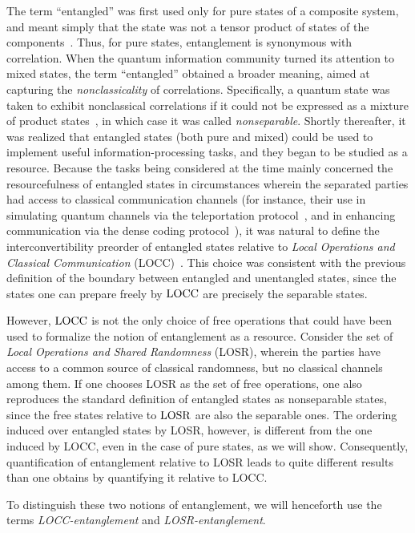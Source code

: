 \documentclass[12pt]{article}
\newcommand{\LOSR}[0]{\ifmmode\textup{\upshape LOSR}\else{\textup{\upshape LOSR}}\fi}
\newcommand{\LOCC}[0]{\ifmmode\textup{\upshape LOCC}\else{\textup{\upshape LOCC}}\fi}
\theoremstyle{plain}
\theoremstyle{definition}
\begin{document}
The term ``entangled'' was first used only for pure states of a composite system, and meant simply that the state was not a tensor product of states of the components~\cite{Schrodinger1935}.  Thus, for pure states, entanglement is synonymous with correlation.  When the quantum information community turned its attention to mixed states, the term ``entangled'' obtained a broader meaning, aimed at capturing the {\em nonclassicality} of correlations.  Specifically, a quantum state was taken to exhibit nonclassical correlations if it could not be expressed as a mixture of product states~\cite{werner1989quantum}, in which case it was called {\em nonseparable}. Shortly thereafter, it was realized that entangled states (both pure and mixed) could be used to implement useful information-processing tasks, and they began to be studied as a resource. Because the tasks being considered at the time mainly concerned the resourcefulness of entangled states in circumstances wherein the separated parties had access to classical communication channels (for instance, their use in simulating quantum channels via the teleportation protocol~\cite{teleportation}, and in enhancing communication via the dense coding protocol~\cite{densecoding}),
it was natural to define the interconvertibility preorder of entangled states relative to {\em Local Operations and Classical Communication} (LOCC)~\cite{BBPS96}.
This choice was consistent with the previous definition of the boundary between entangled and unentangled states, since the states one can prepare freely by $\LOCC$ are precisely the separable states.

However, $\LOCC$ is not the only choice of free operations that could have been used to formalize the notion of entanglement as a resource.  Consider the set of {\em Local Operations and Shared Randomness} (LOSR), wherein the parties have access to a common source of classical randomness, but no classical channels among them.  If one chooses LOSR as the set of free operations, one also reproduces the standard definition of entangled states as nonseparable states, since the free states relative to $\LOSR$ are also the separable ones.
 The ordering induced over entangled states by LOSR, however, is different from the one induced by LOCC, even in the case of pure states, as we will show. Consequently, quantification of entanglement relative to LOSR leads to quite different results than one obtains by quantifying it relative to LOCC.

To distinguish these two notions of entanglement, we will henceforth use the terms {\em LOCC-entanglement} and {\em LOSR-entanglement}.
\end{document}
